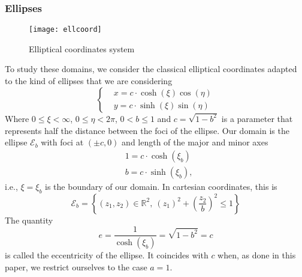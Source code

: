 \documentclass{amsart}
\theoremstyle{definition}
\theoremstyle{remark}
\renewcommand\leq\leqslant
\numberwithin{equation}{section}
\theoremstyle{definition}
\theoremstyle{remark}
\begin{document}
\subsubsection{Ellipses}
\begin{figure}\renewcommand\thefigure{2.3}
	\texttt{[image: ellcoord]}
	\caption{Elliptical coordinates system}\label{elli}
\end{figure} 
To study these domains, we consider the classical elliptical coordinates adapted to the kind of ellipses that we are considering \begin{equation}
	\left\{	\begin{aligned}
		&x =c\cdot \cosh(\xi)\cos(\eta)\\
		&y =c\cdot \sinh(\xi)\sin(\eta)
	\end{aligned}\right.
\end{equation}
Where $0\leq \xi<\infty$, $0\leq \eta<2\pi$, $0<b\leq 1$ and $c=\sqrt{1-b^2}$ is a parameter that represents half the distance between the foci of the ellipse. Our domain is the ellipse $\mathcal{E}_{b}$ with foci at $(\pm c,0)$ and length of the major and minor axes \begin{equation}
	\begin{aligned}
		&1=c\cdot \cosh(\xi_b)\\
		&b=c\cdot \sinh(\xi_b),
	\end{aligned}
\end{equation}i.e., $\xi=\xi_b$ is the boundary of our domain.
In cartesian coordinates, this is \begin{equation}
	\mathcal{E}_{b}=\left\{(z_1,z_2)\in\mathbb{R}^{2},\ \left(z_1\right)^2+\left(\frac{z_2}{b}\right)^2\leq 1\right\}
\end{equation} The quantity \begin{equation}
	e=\frac{1}{\cosh(\xi_b)}=\sqrt{1-b^2}=c
\end{equation}is called the eccentricity of the ellipse. It coincides with $c$ when, as done in this paper, we restrict ourselves to the case $a=1$.
\end{document}
